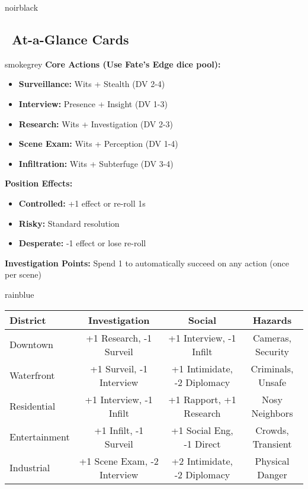 \documentclass[11pt]{article}
\begin{document}
\begin{noirsection}{noirblack}
\subsection*{\faBookmark\ At-a-Glance Cards}

\begin{mechanicbox}{smokegrey}
\textbf{Core Actions (Use Fate's Edge dice pool):}
\begin{itemize}
    \item \textbf{Surveillance:} Wits + Stealth (DV 2-4)
    \item \textbf{Interview:} Presence + Insight (DV 1-3)
    \item \textbf{Research:} Wits + Investigation (DV 2-3)
    \item \textbf{Scene Exam:} Wits + Perception (DV 1-4)
    \item \textbf{Infiltration:} Wits + Subterfuge (DV 3-4)
\end{itemize}

\textbf{Position Effects:}
\begin{itemize}
    \item \textbf{Controlled:} +1 effect or re-roll 1s
    \item \textbf{Risky:} Standard resolution
    \item \textbf{Desperate:} -1 effect or lose re-roll
\end{itemize}

\textbf{Investigation Points:} Spend 1 to automatically succeed on any action (once per scene)
\end{mechanicbox}

\begin{mechanicbox}{rainblue}
\begin{tabular}{|l|c|c|c|}
\hline
\textbf{District} & \textbf{Investigation} & \textbf{Social} & \textbf{Hazards} \\
\hline
Downtown & +1 Research, -1 Surveil & +1 Interview, -1 Infilt & Cameras, Security \\
Waterfront & +1 Surveil, -1 Interview & +1 Intimidate, -2 Diplomacy & Criminals, Unsafe \\
Residential & +1 Interview, -1 Infilt & +1 Rapport, +1 Research & Nosy Neighbors \\
Entertainment & +1 Infilt, -1 Surveil & +1 Social Eng, -1 Direct & Crowds, Transient \\
Industrial & +1 Scene Exam, -2 Interview & +2 Intimidate, -2 Diplomacy & Physical Danger \\
\hline
\end{tabular}
\end{mechanicbox}


\end{noirsection}
\end{document}
